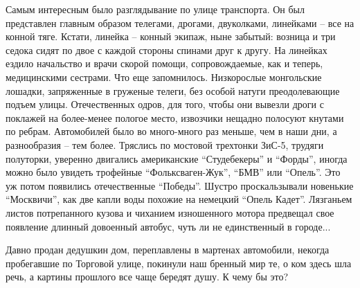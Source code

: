 Самым интересным было разглядывание по улице транспорта. Он был представлен
главным образом телегами, дрогами, двуколками, линейками – все на конной тяге.
Кстати,  линейка – конный экипаж, ныне забытый: возница и три седока сидят по
двое с каждой стороны спинами друг к другу. На линейках ездило начальство и
врачи скорой помощи, сопровождаемые, как и теперь, медицинскими сестрами. Что
еще запомнилось. Низкорослые монгольские лошадки, запряженные в груженые
телеги, без особой натуги преодолевающие подъем улицы. Отечественных одров, для
того, чтобы они вывезли дроги с поклажей на более-менее пологое место,
извозчики нещадно полосуют кнутами по ребрам. Автомобилей было во много-много
раз меньше, чем в наши дни, а разнообразия – тем более. Тряслись по мостовой
трехтонки ЗиС-5, трудяги полуторки, уверенно двигались американские
\enquote{Студебекеры} и \enquote{Форды}, иногда можно было увидеть трофейные \enquote{Фольксваген-Жук},
\enquote{БМВ} или \enquote{Опель}. Это уж потом появились отечественные \enquote{Победы}. Шустро
проскальзывали новенькие \enquote{Москвичи}, как две капли воды похожие на немецкий
\enquote{Опель Кадет}. Лязганьем листов потрепанного кузова и чиханием изношенного
мотора предвещал свое появление длинный довоенный автобус, чуть ли не
единственный в городе...

Давно продан дедушкин дом, переплавлены в мартенах автомобили, некогда
пробегавшие по Торговой улице, покинули наш бренный мир те, о ком здесь шла
речь, а картины прошлого все чаще бередят душу. К чему бы это?
